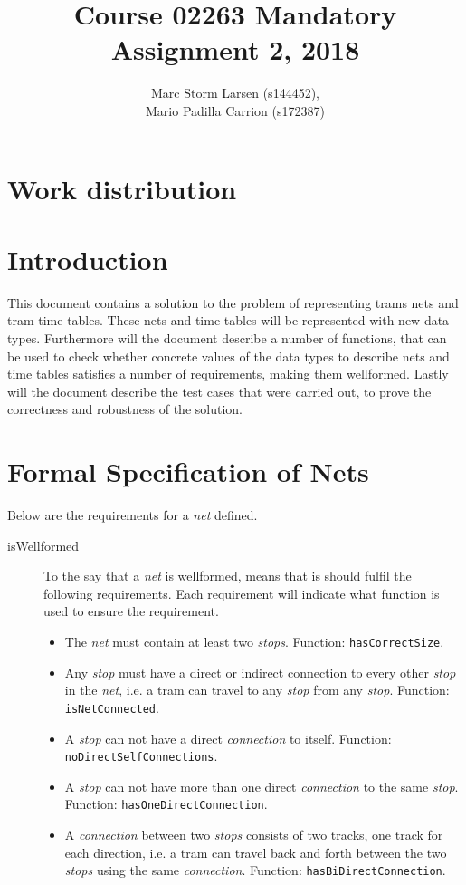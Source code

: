 \documentclass[a4]{article}
\title{Course 02263 Mandatory Assignment 2, 2018}
\author{Marc Storm Larsen (s144452),\\ 
        Mario Padilla Carrion (s172387)}
\begin{document}
\maketitle

\tableofcontents
\newpage

\section{Work distribution}

\section{Introduction}
This document contains a solution to the problem of representing trams nets and tram time tables. These nets and time tables will be represented with new data types. Furthermore will the document describe a number of functions, that can be used to check whether concrete values of the data types to describe nets and time tables satisfies a number of requirements, making them wellformed. Lastly will the document describe the test cases that were carried out, to prove the correctness and robustness of the solution.

\section{Formal Specification of Nets}



\noindent Below are the requirements for a \emph{net} defined. 
\\
\begin{description}
    \item[isWellformed] To the say that a \emph{net} is wellformed, means that is should fulfil the following requirements. Each requirement will indicate what function is used to ensure the requirement.
        \begin{itemize}
            \item The \emph{net} must contain at least two \emph{stops}. Function: \verb=hasCorrectSize=.
            \item Any \emph{stop} must have a direct or indirect connection to every other \emph{stop} in the \emph{net}, i.e. a tram can travel to any \emph{stop} from any \emph{stop}. Function: \verb=isNetConnected=.
            \item A \emph{stop} can not have a direct \emph{connection} to itself. Function: \verb=noDirectSelfConnections=.
            \item A \emph{stop} can not have more than one direct \emph{connection} to the same \emph{stop}. Function: \verb=hasOneDirectConnection=.
            \item A \emph{connection} between two \emph{stops} consists of two tracks, one track for each direction, i.e. a tram can travel back and forth between the two \emph{stops} using the same \emph{connection}. Function: \verb=hasBiDirectConnection=.
        \end{itemize}
\end{description}
\end{document}

